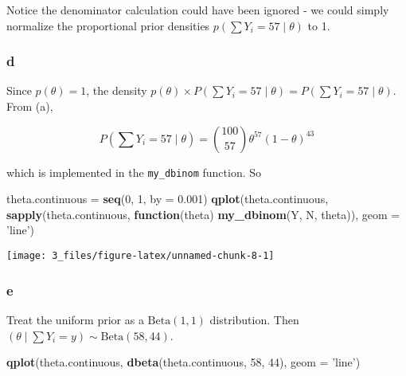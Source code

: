 \documentclass[]{article}
\newenvironment{Shaded}{\begin{snugshade}}{\end{snugshade}}
\newcommand{\ControlFlowTok}[1]{\textcolor[rgb]{0.13,0.29,0.53}{\textbf{#1}}}
\newcommand{\DataTypeTok}[1]{\textcolor[rgb]{0.13,0.29,0.53}{#1}}
\newcommand{\DecValTok}[1]{\textcolor[rgb]{0.00,0.00,0.81}{#1}}
\newcommand{\FloatTok}[1]{\textcolor[rgb]{0.00,0.00,0.81}{#1}}
\newcommand{\KeywordTok}[1]{\textcolor[rgb]{0.13,0.29,0.53}{\textbf{#1}}}
\newcommand{\NormalTok}[1]{#1}
\newcommand{\StringTok}[1]{\textcolor[rgb]{0.31,0.60,0.02}{#1}}
\begin{document}
Notice the denominator calculation could have been ignored - we could
simply normalize the proportional prior densities
\(p(\sum Y_i = 57 \mid \theta)\) to 1.

\hypertarget{d}{%
\subsubsection{d}\label{d}}

Since \(p(\theta) = 1\), the density
\(p(\theta) \times P(\sum Y_i = 57 \mid \theta) = P(\sum Y_i = 57 \mid \theta)\).
From (a),

\[
P(\sum Y_i = 57 \mid \theta) = {100 \choose 57} \theta^{57} (1 - \theta)^{43}
\]

which is implemented in the \texttt{my\_dbinom} function. So

\begin{Shaded}
\begin{Highlighting}[]
\NormalTok{theta.continuous =}\StringTok{ }\KeywordTok{seq}\NormalTok{(}\DecValTok{0}\NormalTok{, }\DecValTok{1}\NormalTok{, }\DataTypeTok{by =} \FloatTok{0.001}\NormalTok{)}
\KeywordTok{qplot}\NormalTok{(theta.continuous, }\KeywordTok{sapply}\NormalTok{(theta.continuous, }\ControlFlowTok{function}\NormalTok{(theta) }\KeywordTok{my_dbinom}\NormalTok{(Y, N, theta)),}
      \DataTypeTok{geom =} \StringTok{'line'}\NormalTok{)}
\end{Highlighting}
\end{Shaded}

\begin{center}\texttt{[image: 3\_files/figure-latex/unnamed-chunk-8-1]} \end{center}

\hypertarget{e}{%
\subsubsection{e}\label{e}}

Treat the uniform prior as a \(\text{Beta}(1, 1)\) distribution. Then
\(\left( \theta \mid \sum Y_i = y \right) \sim \text{Beta}(58, 44)\).

\begin{Shaded}
\begin{Highlighting}[]
\KeywordTok{qplot}\NormalTok{(theta.continuous, }\KeywordTok{dbeta}\NormalTok{(theta.continuous, }\DecValTok{58}\NormalTok{, }\DecValTok{44}\NormalTok{), }\DataTypeTok{geom =} \StringTok{'line'}\NormalTok{)}
\end{Highlighting}
\end{Shaded}
\end{document}

